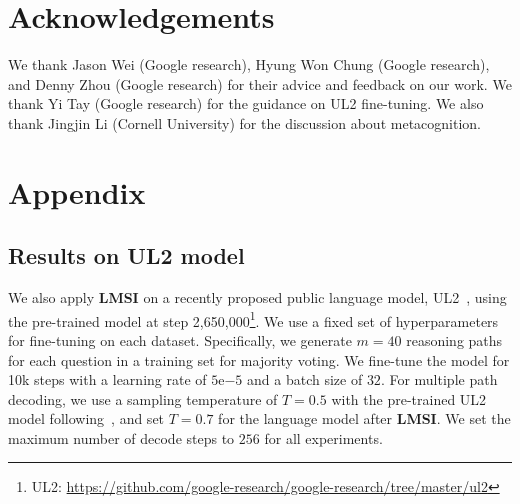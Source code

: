 \documentclass{article} %
\newcommand{\method}{\textbf{LMSI}\xspace}
\begin{document}
\section*{Acknowledgements}
\label{sec:acknowledgements}
We thank Jason Wei (Google research), Hyung Won Chung (Google research), and Denny Zhou (Google research) for their advice and feedback on our work. We thank Yi Tay (Google research) for the guidance on UL2 fine-tuning. We also thank Jingjin Li (Cornell University) for the discussion about metacognition.











\clearpage
\appendix
\section{Appendix}
\label{app:appendix}

\subsection{Results on UL2 model}
We also apply \method on a recently proposed public language model, UL2~\citep{Tay2022UL2UL}, using the pre-trained model at step 2,650,000\footnote{UL2: \url{https://github.com/google-research/google-research/tree/master/ul2}}. We use a fixed set of hyperparameters for fine-tuning on each dataset. Specifically, we generate $m=40$ reasoning paths for each question in a training set for majority voting. We fine-tune the model for 10k steps with a learning rate of $5$e$-5$ and a batch size of $32$. For multiple path decoding, we use a sampling temperature of $T=0.5$ with the pre-trained UL2 model following~\citet{Tay2022UL2UL}, and set $T=0.7$ for the language model after \method. We set the maximum number of decode steps to $256$ for all experiments.
\end{document}
